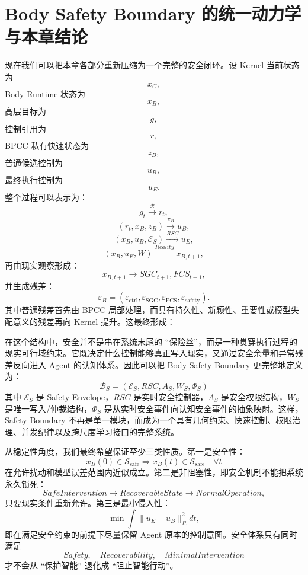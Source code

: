 \section{Body Safety Boundary 的统一动力学与本章结论}

现在我们可以把本章各部分重新压缩为一个完整的安全闭环。设 Kernel 当前状态为
\[
x_C,
\]
Body Runtime 状态为
\[
x_B,
\]
高层目标为
\[
g,
\]
控制引用为
\[
r,
\]
BPCC 私有快速状态为
\[
z_B,
\]
普通候选控制为
\[
u_B,
\]
最终执行控制为
\[
u_E.
\]
整个过程可以表示为：
\[
g_t
\overset{\mathcal R}{\longrightarrow}
r_t,
\]
\[
(r_t,x_B,z_B)
\overset{\pi_B}{\longrightarrow}
u_B,
\]
\[
(x_B,u_B,\mathcal E_S)
\overset{RSC}{\longrightarrow}
u_E,
\]
\[
(x_B,u_E,W)
\overset{Reality}{\longrightarrow}
x_{B,t+1},
\]
再由现实观察形成：
\[
x_{B,t+1}
\rightarrow
SGC_{t+1},FCS_{t+1},
\]
并生成残差：
\[
\varepsilon_B
=
(
\varepsilon_{\mathrm{ctrl}},
\varepsilon_{\mathrm{SGC}},
\varepsilon_{\mathrm{FCS}},
\varepsilon_{\mathrm{safety}}
).
\]
其中普通残差首先由 BPCC 局部处理，而具有持久性、新颖性、重要性或模型失配意义的残差再向 Kernel 提升。这最终形成：
\begin{statementbox}
\centering
{}
\end{statementbox}

在这个结构中，安全并不是串在系统末尾的 ``保险丝''，而是一种贯穿执行过程的现实可行域约束。它既决定什么控制能够真正写入现实，又通过安全余量和异常残差反向进入 Agent 的认知体系。因此可以把 Body Safety Boundary 更完整地定义为：
\[
\boxed{
\mathcal B_S
=
(
\mathcal E_S,
RSC,
A_S,
W_S,
\Phi_S
)
}
\]
其中 $\mathcal E_S$ 是 Safety Envelope，$RSC$ 是实时安全控制器，$A_S$ 是安全权限结构，$W_S$ 是唯一写入/仲裁结构，$\Phi_S$ 是从实时安全事件向认知安全事件的抽象映射。这样，Safety Boundary 不再是单一模块，而成为一个具有几何约束、快速控制、权限治理、并发纪律以及跨尺度学习接口的完整系统。

从稳定性角度，我们最终希望保证至少三类性质。第一是安全性：
\[
x_B(0)\in\mathcal S_{\mathrm{safe}}
\Rightarrow
x_B(t)\in\mathcal S_{\mathrm{safe}}
\quad
\forall t
\]
在允许扰动和模型误差范围内近似成立。第二是非阻塞性，即安全机制不能把系统永久锁死：
\[
SafeIntervention
\rightarrow
RecoverableState
\rightarrow
NormalOperation,
\]
只要现实条件重新允许。第三是最小侵入性：
\[
\min
\int
\|u_E-u_B\|_R^2dt,
\]
即在满足安全约束的前提下尽量保留 Agent 原本的控制意图。安全体系只有同时满足
\[
Safety,\quad Recoverability,\quad MinimalIntervention
\]
才不会从 ``保护智能'' 退化成 ``阻止智能行动''。

